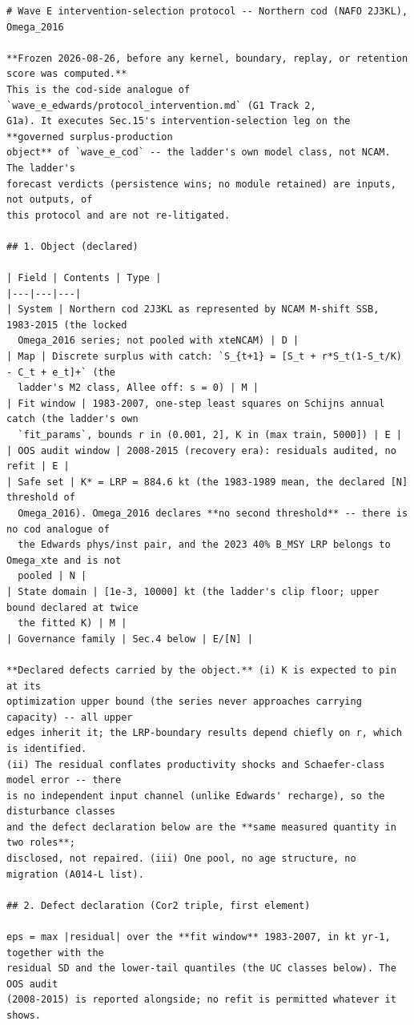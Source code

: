 \begin{footnotesize}\begin{verbatim}
# Wave E intervention-selection protocol -- Northern cod (NAFO 2J3KL), Omega_2016

**Frozen 2026-08-26, before any kernel, boundary, replay, or retention score was computed.**
This is the cod-side analogue of `wave_e_edwards/protocol_intervention.md` (G1 Track 2,
G1a). It executes Sec.15's intervention-selection leg on the **governed surplus-production
object** of `wave_e_cod` -- the ladder's own model class, not NCAM. The ladder's
forecast verdicts (persistence wins; no module retained) are inputs, not outputs, of
this protocol and are not re-litigated.

## 1. Object (declared)

| Field | Contents | Type |
|---|---|---|
| System | Northern cod 2J3KL as represented by NCAM M-shift SSB, 1983-2015 (the locked
  Omega_2016 series; not pooled with xteNCAM) | D |
| Map | Discrete surplus with catch: `S_{t+1} = [S_t + r*S_t(1-S_t/K) - C_t + e_t]+` (the
  ladder's M2 class, Allee off: s = 0) | M |
| Fit window | 1983-2007, one-step least squares on Schijns annual catch (the ladder's own
  `fit_params`, bounds r in (0.001, 2], K in (max train, 5000]) | E |
| OOS audit window | 2008-2015 (recovery era): residuals audited, no refit | E |
| Safe set | K* = LRP = 884.6 kt (the 1983-1989 mean, the declared [N] threshold of
  Omega_2016). Omega_2016 declares **no second threshold** -- there is no cod analogue of
  the Edwards phys/inst pair, and the 2023 40% B_MSY LRP belongs to Omega_xte and is not
  pooled | N |
| State domain | [1e-3, 10000] kt (the ladder's clip floor; upper bound declared at twice
  the fitted K) | M |
| Governance family | Sec.4 below | E/[N] |

**Declared defects carried by the object.** (i) K is expected to pin at its
optimization upper bound (the series never approaches carrying capacity) -- all upper
edges inherit it; the LRP-boundary results depend chiefly on r, which is identified.
(ii) The residual conflates productivity shocks and Schaefer-class model error -- there
is no independent input channel (unlike Edwards' recharge), so the disturbance classes
and the defect declaration below are the **same measured quantity in two roles**;
disclosed, not repaired. (iii) One pool, no age structure, no migration (A014-L list).

## 2. Defect declaration (Cor2 triple, first element)

eps = max |residual| over the **fit window** 1983-2007, in kt yr-1, together with the
residual SD and the lower-tail quantiles (the UC classes below). The OOS audit
(2008-2015) is reported alongside; no refit is permitted whatever it shows.


\end{verbatim}
\end{footnotesize}
